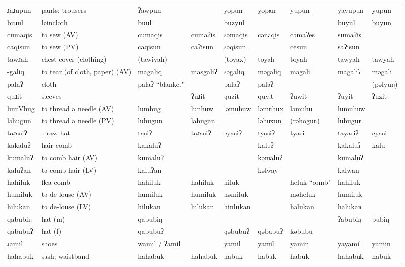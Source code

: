 \begin{landscape}
\begin{longtable}{*{9}{>{\raggedright\arraybackslash}p{}}}
\text{*}ɹaɹupun & pants; trousers & ʔawpun &  & yopun & yopan & yupun & yayupun & yupun\\
\text{*}buɹul & loincloth & buul &  & buzyul &  &  & buyul & buyun\\
\text{*}cumaqis & to sew (AV) & cumaqis & cumaʔis & səmaqis & cənaqis & cəmaʔes & sumaʔis & \\
\text{*}caqisun & to sew (PV) & caqisun & caʔisun & səqisun &  & cesun & saʔisun & \\
\text{*}tawɹah & chest cover (clothing) & (tawiyah) &  & (toyax) & toyah & toyah & tawyah & tawyah\\
\text{*}-galiq & to tear (of cloth, paper) (AV) & magaliq & masgaliʔ & səgaliq & məgaliq & məgali & magaliʔ & məgali\\
\text{*}palaʔ & cloth & palaʔ ``blanket" &  & palaʔ & palaʔ &  &  & (pəlyuŋ)\\
\text{*}quɹit & sleeves &  & ʔuɹit & quzit & quyit & ʔuwit & ʔuyit & ʔuzit\\
\text{*}lumVhug & to thread a needle (AV) & lumhug & lunhuw & ləmuhuw & ləmuhux & ləmuhu & lumuhuw & \\
\text{*}ləhugun & to thread a needle (PV) & luhugun & lahugan &  & ləhuxun & (rəhogun) & luhugun & \\
\text{*}taɹasiʔ & straw hat & tasiʔ & taɹasiʔ & cyasiʔ & tyasiʔ & tyasi & tayasiʔ & cyasi\\
\text{*}kakaluʔ & hair comb & kakaluʔ &  &  & kaluʔ &  & kakaluʔ & kalu\\
\text{*}kumaluʔ & to comb hair (AV) & kumaluʔ &  &  & kəmaluʔ &  & kumaluʔ & \\
\text{*}kaluʔan & to comb hair (LV) & kaluʔan &  &  & kəlway &  & kalwan & \\
\text{*}hahiluk & flea comb & hahiluk & hahiluk & hiluk &  & heluk ``comb" & hahiluk & \\
\text{*}humiluk & to de-louse (AV) & humiluk & humiluk & həmiluk &  & məheluk & humiluk & \\
\text{*}hilukan & to de-louse (LV) & hilukan & hilukan & hinlukan &  & həlukan & halukan & \\
\text{*}qabubiŋ & hat (m) & qabubiŋ &  &  &  &  & ʔabubiŋ & bubiŋ\\
\text{*}qabubuʔ & hat (f) & qabubuʔ &  & qəbubuʔ & qəbubuʔ & kəbubu &  & \\
\text{*}ɹamil & shoes & wamil / ʔamil &  & yamil & yamil & yamin & yayamil & yamin\\
\text{*}hahabuk & sash; waistband & hahabuk & hahabuk & habuk & habuk & habuk & hahabuk & habuk\\

\end{longtable}
\end{landscape}

